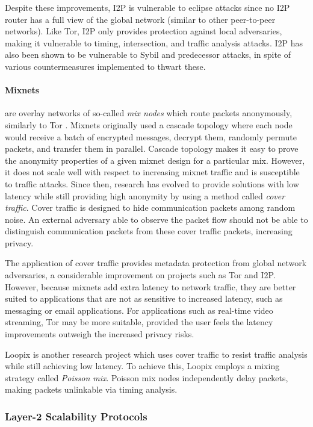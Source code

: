 Despite these improvements, I2P is vulnerable to eclipse attacks since no I2P router has a full view of the global network (similar to other peer-to-peer networks). Like Tor, I2P only provides protection against local adversaries, making it vulnerable to timing, intersection, and traffic analysis attacks. I2P has also been shown to be vulnerable to Sybil and predecessor attacks, in spite of various countermeasures implemented to thwart these.

\paragraph{Mixnets} are overlay networks of so-called \textit{mix nodes} which route packets anonymously, similarly to Tor \cite{mixnets}. Mixnets originally used a cascade topology where each node would receive a batch of encrypted messages, decrypt them, randomly permute packets, and transfer them in parallel. Cascade topology makes it easy to prove the anonymity properties of a given mixnet design for a particular mix. However, it does not scale well with respect to increasing mixnet traffic and is susceptible to traffic attacks. Since then, research has evolved to provide solutions with low latency while still providing high anonymity by using a method called \textit{cover traffic}. Cover traffic is designed to hide communication packets among random noise. An external adversary able to observe the packet flow should not be able to distinguish communication packets from these cover traffic packets, increasing privacy.

The application of cover traffic provides metadata protection from global network adversaries, a considerable improvement on projects such as Tor and I2P. However, because mixnets add extra latency to network traffic, they are better suited to applications that are not as sensitive to increased latency, such as messaging or email applications. For applications such as real-time video streaming, Tor may be more suitable, provided the user feels the latency improvements outweigh the increased privacy risks.

Loopix \cite{loopix} is another research project which uses cover traffic to resist traffic analysis while still achieving low latency. To achieve this, Loopix employs a mixing strategy called \textit{Poisson mix}. Poisson mix nodes independently delay packets, making packets unlinkable via timing analysis.

\subsubsection{Layer-2 Scalability Protocols}
\label{sec:intro:stateoftheart:l2protocols}

